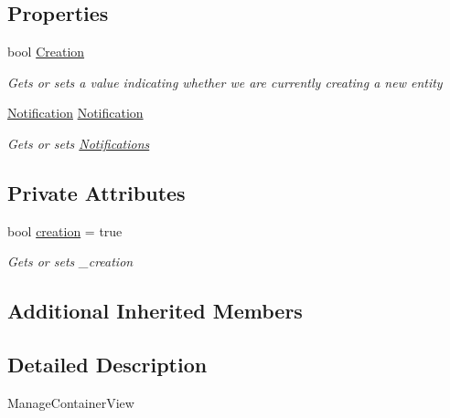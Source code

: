 \subsection*{Properties}
\begin{DoxyCompactItemize}
\item 
bool \mbox{\hyperlink{class_gtd_app_1_1_console_1_1_views_1_1_notifications_1_1_manage_notification_view_ab1e947d877982bbe7197b69e6cbc9df2}{Creation}}
\begin{DoxyCompactList}\small\item\em Gets or sets a value indicating whether we are currently creating a new entity \end{DoxyCompactList}\item 
\mbox{\hyperlink{class_gtd_app_1_1_data_1_1_notification}{Notification}} \mbox{\hyperlink{class_gtd_app_1_1_console_1_1_views_1_1_notifications_1_1_manage_notification_view_acaa5af98f74844b709d93e4af7b8aaac}{Notification}}
\begin{DoxyCompactList}\small\item\em Gets or sets \mbox{\hyperlink{namespace_gtd_app_1_1_console_1_1_views_1_1_notifications}{Notifications}} \end{DoxyCompactList}\end{DoxyCompactItemize}
\subsection*{Private Attributes}
\begin{DoxyCompactItemize}
\item 
bool \mbox{\hyperlink{class_gtd_app_1_1_console_1_1_views_1_1_notifications_1_1_manage_notification_view_af5b16309a83839ff81150ae8213ff154}{creation}} = true
\begin{DoxyCompactList}\small\item\em Gets or sets \+\_\+creation \end{DoxyCompactList}\end{DoxyCompactItemize}
\subsection*{Additional Inherited Members}


\subsection{Detailed Description}
Manage\+Container\+View 



